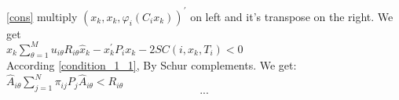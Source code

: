 \documentclass[conference]{IEEEtran}
\begin{document}
\eqref{cons} multiply $(x_k,x_k,\varphi_{i}(C_{i}x_k))^{'}$ on left and it's transpose on the right. We get\\
$\hat{x}_k\sum_{\theta=1}^{M}u_{i\theta}R_{i\theta}\hat{x}_k-x^{'}_{k}P_{i}x_{k}-2SC(i,x_k,T_i)<0$
\\
According \eqref{condition_1_1}, By Schur complements. We get:\\
$\hat{A}_{i\theta}\sum_{j=1}^{N}\pi_{ij}P_j\hat{A}_{i\theta}<R_{i\theta}$\\
\begin{equation}
...
\end{equation}


















\end{document}

